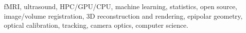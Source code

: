 




fMRI, ultrasound, HPC/GPU/CPU, machine learning, statistics, open source, image/volume registration, 3D reconstruction and rendering, epipolar geometry, optical calibration, tracking, camera optics, computer science.


